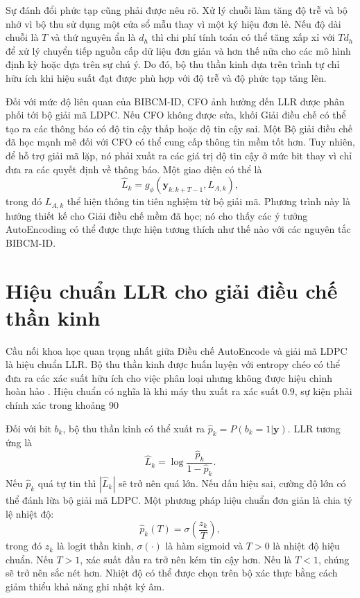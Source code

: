 Sự đánh đổi phức tạp cũng phải được nêu rõ. Xử lý chuỗi làm tăng độ trễ và bộ nhớ vì bộ thu sử dụng một cửa sổ mẫu thay vì một ký hiệu đơn lẻ. Nếu độ dài chuỗi là $T$ và thứ nguyên ẩn là $d_h$ thì chi phí tính toán có thể tăng xấp xỉ với $T d_h$ để xử lý chuyển tiếp nguồn cấp dữ liệu đơn giản và hơn thế nữa cho các mô hình định kỳ hoặc dựa trên sự chú ý. Do đó, bộ thu thần kinh dựa trên trình tự chỉ hữu ích khi hiệu suất đạt được phù hợp với độ trễ và độ phức tạp tăng lên.

Đối với mức độ liên quan của BIBCM-ID, CFO ảnh hưởng đến LLR được phân phối tới bộ giải mã LDPC. Nếu CFO không được sửa, khối Giải điều chế có thể tạo ra các thông báo có độ tin cậy thấp hoặc độ tin cậy sai. Một Bộ giải điều chế đã học mạnh mẽ đối với CFO có thể cung cấp thông tin mềm tốt hơn. Tuy nhiên, để hỗ trợ giải mã lặp, nó phải xuất ra các giá trị độ tin cậy ở mức bit thay vì chỉ đưa ra các quyết định về thông báo. Một giao diện có thể là
\begin{equation}
  \hat{L}_k=g_\phi(\mathbf{y}_{k:k+T-1},L_{A,k}),
\end{equation}
trong đó $L_{A,k}$ thể hiện thông tin tiên nghiệm từ bộ giải mã. Phương trình này là hướng thiết kế cho Giải điều chế mềm đã học; nó cho thấy các ý tưởng AutoEncoding có thể được thực hiện tương thích như thế nào với các nguyên tắc BIBCM-ID.

\section{Hiệu chuẩn LLR cho giải điều chế thần kinh}
Cầu nối khoa học quan trọng nhất giữa Điều chế AutoEncode và giải mã LDPC là hiệu chuẩn LLR. Bộ thu thần kinh được huấn luyện với entropy chéo có thể đưa ra các xác suất hữu ích cho việc phân loại nhưng không được hiệu chỉnh hoàn hảo \cite{guo2017}. Hiệu chuẩn có nghĩa là khi máy thu xuất ra xác suất $0.9$, sự kiện phải chính xác trong khoảng 90%

Đối với bit $b_k$, bộ thu thần kinh có thể xuất ra $\hat{p}_k=P(b_k=1|\mathbf{y})$. LLR tương ứng là
\begin{equation}
  \hat{L}_k=\log\frac{\hat{p}_k}{1-\hat{p}_k}.
\end{equation}
Nếu $\hat{p}_k$ quá tự tin thì $|\hat{L}_k|$ sẽ trở nên quá lớn. Nếu dấu hiệu sai, cường độ lớn có thể đánh lừa bộ giải mã LDPC. Một phương pháp hiệu chuẩn đơn giản là chia tỷ lệ nhiệt độ:
\begin{equation}
  \hat{p}_k(T)=\sigma\left(\frac{z_k}{T}\right),
\end{equation}
trong đó $z_k$ là logit thần kinh, $\sigma(\cdot)$ là hàm sigmoid và $T>0$ là nhiệt độ hiệu chuẩn. Nếu $T>1$, xác suất đầu ra trở nên kém tin cậy hơn. Nếu là $T<1$, chúng sẽ trở nên sắc nét hơn. Nhiệt độ có thể được chọn trên bộ xác thực bằng cách giảm thiểu khả năng ghi nhật ký âm.

